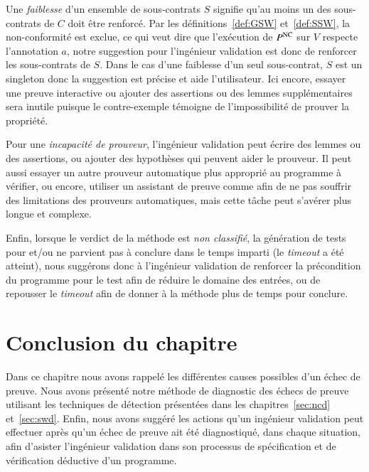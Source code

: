 Une \emph{faiblesse} d'un ensemble de sous-contrats $S$ signifie qu'au moins un
des sous-contrats de $C$ doit être renforcé.
Par les définitions~\ref{def:GSW} et~\ref{def:SSW}, la non-conformité est
exclue, ce qui veut dire que l'exécution de $P^{\mathrm{NC}}$ sur $V$ respecte
l'annotation $a$, notre suggestion pour l'ingénieur validation est donc de
renforcer les sous-contrats de $S$.
Dans le cas d'une faiblesse d'un seul sous-contrat, $S$ est un singleton donc
la suggestion est précise et aide l'utilisateur.
Ici encore, essayer une preuve interactive ou ajouter des assertions ou des
lemmes supplémentaires sera inutile puisque le contre-exemple témoigne de
l'impossibilité de prouver la propriété.

Pour une \emph{incapacité de prouveur}, l'ingénieur validation peut écrire des
lemmes ou des assertions, ou ajouter des hypothèses qui peuvent aider le
prouveur.
Il peut aussi essayer un autre prouveur automatique plus approprié au programme
à vérifier, ou encore, utiliser un assistant de preuve comme \coq afin de ne
pas souffrir des limitations des prouveurs automatiques, mais cette tâche peut
s'avérer plus longue et complexe.

Enfin, lorsque le verdict de la méthode est \emph{non classifié}, la génération
de tests pour \NCD et/ou \SWD ne parvient pas à conclure dans le temps imparti
(le {\em timeout} a été atteint), nous suggérons donc à l'ingénieur validation
de renforcer la précondition du programme pour le test afin de réduire le
domaine des entrées, ou de repousser le {\em timeout} afin de donner à la
méthode plus de temps pour conclure.


\section*{Conclusion du chapitre}


Dans ce chapitre nous avons rappelé les différentes causes possibles d'un échec
de preuve.
Nous avons présenté notre méthode de diagnostic des échecs de
preuve utilisant les techniques de détection présentées dans les
chapitres~\ref{sec:ncd} et~\ref{sec:swd}.
Enfin, nous avons suggéré les actions qu'un ingénieur validation peut effectuer
après qu'un échec de preuve ait été diagnostiqué, dans chaque situation, afin
d'asister l'ingénieur validation dans son processus de spécification et de
vérification déductive d'un programme.
